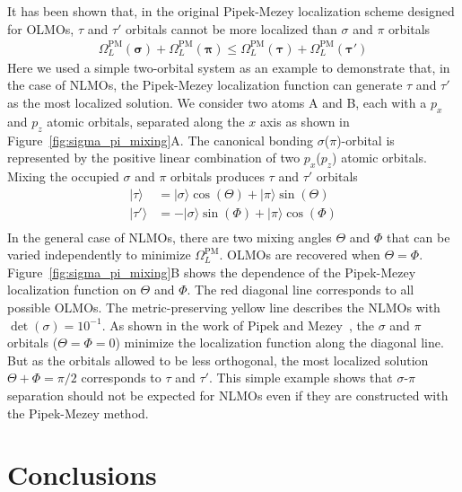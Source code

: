 \documentclass[aps,prl,reprint,amsmath,amssymb]{revtex4-1}
\newcommand{\ket}[1]{\ensuremath{\vert #1 \rangle}}
\begin{document}
It has been shown that, in the original Pipek-Mezey localization scheme designed for OLMOs, $\tau$ and $\tau'$ orbitals cannot be more localized than $\sigma$ and $\pi$ orbitals~\cite{pipek1989fast}
%
\begin{equation} \label{eq:OLMO-pipek}
\begin{split}
\Omega_L^{\text{PM}}(\mathbf{\sigma}) + \Omega_L^{\text{PM}}(\mathbf{\pi}) \leqslant \Omega_L^{\text{PM}}(\mathbf{\tau}) + \Omega_L^{\text{PM}}(\mathbf{\tau'})
\end{split}
\end{equation}
%
Here we used a simple two-orbital system as an example to demonstrate that, in the case of NLMOs, the Pipek-Mezey localization function can generate $\tau$ and $\tau'$ as the most localized solution. 
We consider two atoms A and B, each with a $p_x$ and $p_z$ atomic orbitals, separated along the $x$ axis as shown in Figure~\ref{fig:sigma_pi_mixing}A.
The canonical bonding $\sigma$($\pi$)-orbital is represented by the positive linear combination of two $p_x$($p_z$) atomic orbitals. 
Mixing the occupied $\sigma$ and $\pi$ orbitals produces $\tau$ and $\tau'$ orbitals
%
\begin{equation} \label{eq:tao-pipek}
\begin{split}
\ket{\tau} &= \ket{\sigma}\cos(\Theta) + \ket{\pi} \sin(\Theta)\\
\ket{\tau'} &= - \ket{\sigma} \sin(\Phi) + \ket{\pi} \cos(\Phi) \\
\end{split}
\end{equation}
%
In the general case of NLMOs, there are two mixing angles $\Theta$ and $\Phi$ that can be varied independently to minimize $\Omega^{\text{PM}}_L$. OLMOs are recovered when $\Theta = \Phi$. 
Figure~\ref{fig:sigma_pi_mixing}B shows the dependence of the Pipek-Mezey localization function on $\Theta$ and $\Phi$. 
The red diagonal line corresponds to all possible OLMOs. The metric-preserving yellow line describes the NLMOs with $\det(\sigma) = 10^{-1}$. 
As shown in the work of Pipek and Mezey~\cite{pipek1989fast}, the $\sigma$ and $\pi$ orbitals ($\Theta=\Phi=0$) minimize the localization function along the diagonal line. 
But as the orbitals allowed to be less orthogonal, the most localized solution $\Theta+\Phi=\pi/2$ corresponds to $\tau$ and $\tau'$. 
This simple example shows that $\sigma$-$\pi$ separation should not be expected for NLMOs even if they are constructed with the Pipek-Mezey method.

\section{Conclusions}
\end{document}
